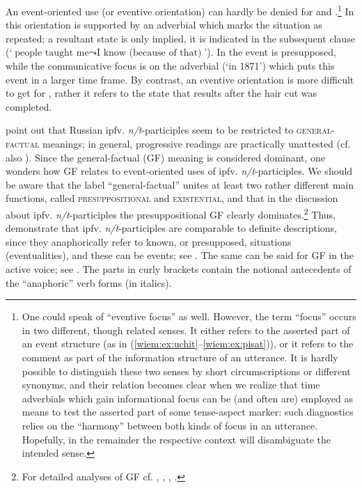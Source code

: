 \documentclass[output=paper]{langscibook}
\begin{document}
\z
\z

\noindent An event-oriented use (or eventive orientation) can hardly be denied for  and .\footnote{\label{wiem:foot:OneCouldSpeak}One could speak of ``eventive focus''  as well. However, the term ``focus'' occurs in two different, though related senses. It either refers to the asserted part of an event structure (as in (\ref{wiem:ex:uchit}--\ref{wiem:ex:pisat})), or it refers to the comment as part of the information structure of an utterance. It is hardly possible to distinguish these two senses by short circumscriptions or different synonyms, and their relation becomes clear when we realize that time adverbials which gain informational focus can be (and often are) employed as means to test the asserted part of some tense-aspect marker: such diagnostics relies on the “harmony” between both kinds of focus in an utterance. Hopefully, in the remainder the respective context will disambiguate the intended sense.} In  this orientation is supported by an adverbial which marks the situation as repeated; a resultant state is only implied, it is indicated in the subsequent clause
(‘$\text{people taught me}\leadsto\text{I know (because of that)}$’).
In  the event is presupposed, while the communicative focus is on the adverbial (‘in 1871’) which puts this event in a larger time frame. By contrast, an eventive orientation is more difficult to get for , rather it refers to the state that results after the hair cut was completed.\largerpage[1]

\citet{Borik.Gehrke2018} point out that Russian ipfv. \textit{n/t}-participles seem to be restricted to \textsc{general-factual} meanings; in general, progressive readings are practically unattested (cf. also \cites[57--58]{Knjazev1989}[489]{Knjazev2007}). Since the general-factual (GF) meaning is considered dominant, one wonders how GF relates to event-oriented uses of ipfv. \textit{n/t}-participles. We should be aware that the label ``general-factual'' unites at least two rather different main functions, called \textsc{presuppositional} and \textsc{existential}, and that in the discussion about ipfv. \textit{n/t}-participles the presuppositional GF clearly dominates.\footnote{For detailed analyses of GF cf. \citet{Groenn2004}, \citet{Mehlig2011}, \citet{Dickey2015}, \citet{Mueller-Reichau2018}.} Thus, \citeauthor{Borik.Gehrke2018} demonstrate that ipfv. \textit{n/t}-participles are comparable to definite descriptions, since they anaphorically refer to known, or presupposed, situations (eventualities), and these can be events; see . The same can be said for GF in the active voice; see . The parts in curly brackets contain the notional antecedents of the “anaphoric” verb forms (in italics).\largerpage
\end{document}

